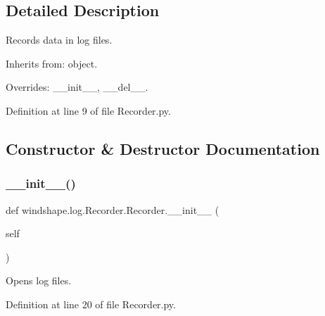 \subsection{Detailed Description}
\begin{DoxyVerb}Records data in log files.

Inherits from: object.

Overrides: __init__, __del__.
\end{DoxyVerb}
 

Definition at line 9 of file Recorder.\+py.



\subsection{Constructor \& Destructor Documentation}
\mbox{\label{classwindshape_1_1log_1_1_recorder_1_1_recorder_ad1009efa21f00b91429e6516734d5805}} 
\subsubsection{\texorpdfstring{\+\_\+\+\_\+init\+\_\+\+\_\+()}{\_\_init\_\_()}}
{\footnotesize\ttfamily def windshape.\+log.\+Recorder.\+Recorder.\+\_\+\+\_\+init\+\_\+\+\_\+ (\begin{DoxyParamCaption}\item[{}]{self }\end{DoxyParamCaption})}

\begin{DoxyVerb}Opens log files.\end{DoxyVerb}
 

Definition at line 20 of file Recorder.\+py.

